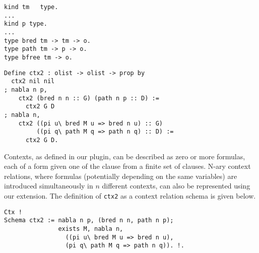 \documentclass[nocopyrightspace,authoryear]{sigplanconf}
\begin{document}
\begin{lstlisting}
kind tm   type.
...
kind p type.
...
type bred tm -> tm -> o.
type path tm -> p -> o.
type bfree tm -> o.
\end{lstlisting}
\begin{lstlisting}
Define ctx2 : olist -> olist -> prop by
  ctx2 nil nil
; nabla n p,
    ctx2 (bred n n :: G) (path n p :: D) := 
      ctx2 G D
; nabla n,
    ctx2 ((pi u\ bred M u => bred n u) :: G)
         ((pi q\ path M q => path n q) :: D) :=
      ctx2 G D.
\end{lstlisting}

Contexts, as defined in our plugin, can be described as zero or more formulas, each of a form given one of the clause from a finite set of clauses. N-ary context relations, where formulas (potentially depending on the same variables) are introduced simultaneously in  $n$ different contexts, can also be represented using our extension. The definition of \lstinline|ctx2| as a context relation schema is given below.

\begin{lstlisting}
Ctx !
Schema ctx2 := nabla n p, (bred n n, path n p);
               exists M, nabla n, 
                 ((pi u\ bred M u => bred n u), 
                 (pi q\ path M q => path n q)). !.
\end{lstlisting}


\end{document}
